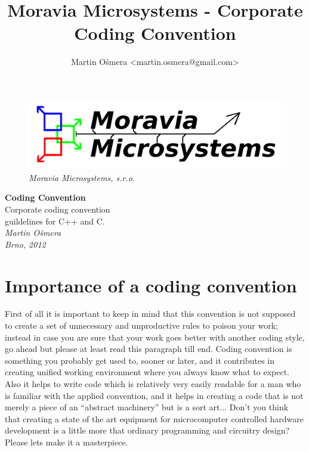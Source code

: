 \documentclass[a4paper,twoside,15pt]{book}
\title{Moravia Microsystems - Corporate Coding Convention}
\author{Martin Ošmera <martin.osmera@gmail.com>}
\begin{document}
\begin{titlepage}
        \begin{figure}[ht!]
                \centering{}
                \includegraphics[width=.9\textwidth]{Moravia_Microsystems.png}
                \caption{\textit{Moravia Microsystems, s.r.o.}}
        \end{figure}
        \begin{center}
                \fontsize{35.83pt}{60pt} \selectfont{}
                \textbf{Coding Convention}
                \\[2cm]
                \fontsize{25pt}{30pt} \selectfont{}
                Corporate coding convention\\
                guildelines for C++ and C.
                \\[1cm]
                \fontsize{14.4pt}{20pt} \selectfont{}
                \textit{Martin Ošmera\\Brno, 2012}
        \end{center}
\end{titlepage}

\tableofcontents

\chapter{Importance of a coding convention}
    First of all it is important to keep in mind that this convention is not supposed to create a set of unnecessary and unproductive rules to poison your work; instead in case you are sure that your work goes better with another coding style, go ahead but please at least read this paragraph till end. Coding convention is something you probably get used to, sooner or later, and it contributes in creating unified working environment where you always know what to expect. Also it helps to write code which is relatively very easily readable for a man who is familiar with the applied convention, and it helps in creating a code that is not merely a piece of an ``abstract machinery'' but is a sort art... Don't you think that creating a state of the art equipment for microcomputer controlled hardware development is a little more that ordinary programming and circuitry design? Please lets make it a masterpiece.
\end{document}
